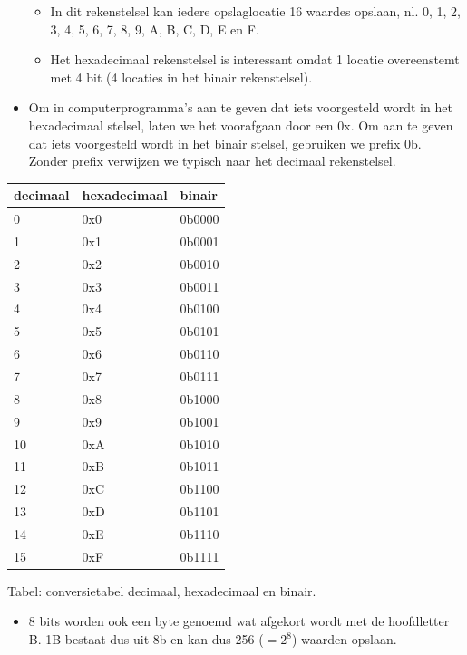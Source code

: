 \documentclass[]{tufte-book}
\providecommand{\tightlist}{%
  \setlength{\itemsep}{0pt}\setlength{\parskip}{0pt}}
\begin{document}
\begin{itemize}
  \begin{itemize}
  \tightlist
  \item
    In dit rekenstelsel kan iedere opslaglocatie 16 waardes opslaan, nl. 0, 1, 2, 3, 4, 5, 6, 7, 8, 9, A, B, C, D, E en F.
  \item
    Het hexadecimaal rekenstelsel is interessant omdat 1 locatie overeenstemt met 4 bit (4 locaties in het binair rekenstelsel).
  \end{itemize}
\item
  Om in computerprogramma's aan te geven dat iets voorgesteld wordt in het hexadecimaal stelsel, laten we het voorafgaan door een 0x. Om aan te geven dat iets voorgesteld wordt in het binair stelsel, gebruiken we prefix 0b. Zonder prefix verwijzen we typisch naar het decimaal rekenstelsel.
\end{itemize}

\begin{longtable}[]{@{}lll@{}}
\toprule
decimaal & hexadecimaal & binair \\
\midrule
\endhead
0 & 0x0 & 0b0000 \\
1 & 0x1 & 0b0001 \\
2 & 0x2 & 0b0010 \\
3 & 0x3 & 0b0011 \\
4 & 0x4 & 0b0100 \\
5 & 0x5 & 0b0101 \\
6 & 0x6 & 0b0110 \\
7 & 0x7 & 0b0111 \\
8 & 0x8 & 0b1000 \\
9 & 0x9 & 0b1001 \\
10 & 0xA & 0b1010 \\
11 & 0xB & 0b1011 \\
12 & 0xC & 0b1100 \\
13 & 0xD & 0b1101 \\
14 & 0xE & 0b1110 \\
15 & 0xF & 0b1111 \\
\bottomrule
\end{longtable}

Tabel: conversietabel decimaal, hexadecimaal en binair.

\begin{itemize}
\tightlist
\item
  8 bits worden ook een byte genoemd wat afgekort wordt met de hoofdletter B. 1B bestaat dus uit 8b en kan dus 256 (\(=2^8\)) waarden opslaan.
\end{itemize}
\end{document}
